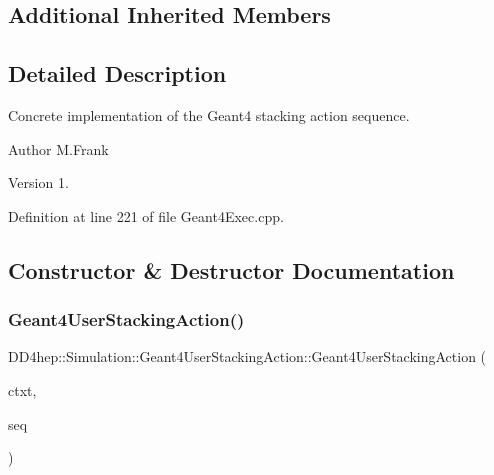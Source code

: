 \subsection*{Additional Inherited Members}


\subsection{Detailed Description}
Concrete implementation of the Geant4 stacking action sequence. 

\begin{DoxyAuthor}{Author}
M.\+Frank 
\end{DoxyAuthor}
\begin{DoxyVersion}{Version}
1. 
\end{DoxyVersion}


Definition at line 221 of file Geant4\+Exec.\+cpp.



\subsection{Constructor \& Destructor Documentation}
\hypertarget{class_d_d4hep_1_1_simulation_1_1_geant4_user_stacking_action_a34c062c0fa5934878f532ef10f9c96d5}{}\label{class_d_d4hep_1_1_simulation_1_1_geant4_user_stacking_action_a34c062c0fa5934878f532ef10f9c96d5} 
\subsubsection{\texorpdfstring{Geant4\+User\+Stacking\+Action()}{Geant4UserStackingAction()}}
{\footnotesize\ttfamily D\+D4hep\+::\+Simulation\+::\+Geant4\+User\+Stacking\+Action\+::\+Geant4\+User\+Stacking\+Action (\begin{DoxyParamCaption}\item[{\hyperlink{class_d_d4hep_1_1_simulation_1_1_geant4_context}{Geant4\+Context} $\ast$}]{ctxt,  }\item[{\hyperlink{class_d_d4hep_1_1_simulation_1_1_geant4_stacking_action_sequence}{Geant4\+Stacking\+Action\+Sequence} $\ast$}]{seq }\end{DoxyParamCaption})\hspace{0.3cm}{\ttfamily [inline]}}



